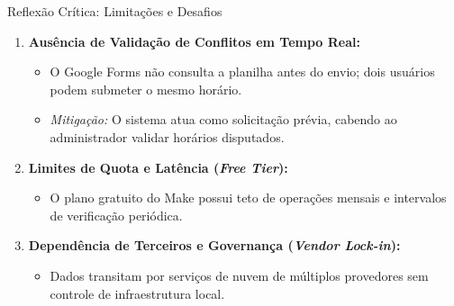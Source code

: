 \documentclass[aspectratio=169, 10pt]{beamer}
\begin{document}
\begin{frame}{Reflexão Crítica: Limitações e Desafios}
    \begin{enumerate}
        \item \textbf{Ausência de Validação de Conflitos em Tempo Real:}
        \begin{itemize}
            \item O Google Forms não consulta a planilha antes do envio; dois usuários podem submeter o mesmo horário.
            \item \textit{Mitigação:} O sistema atua como solicitação prévia, cabendo ao administrador validar horários disputados.
        \end{itemize}
        \vspace{0.2cm}
        \item \textbf{Limites de Quota e Latência (\textit{Free Tier}):}
        \begin{itemize}
            \item O plano gratuito do Make possui teto de operações mensais e intervalos de verificação periódica.
        \end{itemize}
        \vspace{0.2cm}
        \item \textbf{Dependência de Terceiros e Governança (\textit{Vendor Lock-in}):}
        \begin{itemize}
            \item Dados transitam por serviços de nuvem de múltiplos provedores sem controle de infraestrutura local.
        \end{itemize}
    \end{enumerate}
\end{frame}
\end{document}
